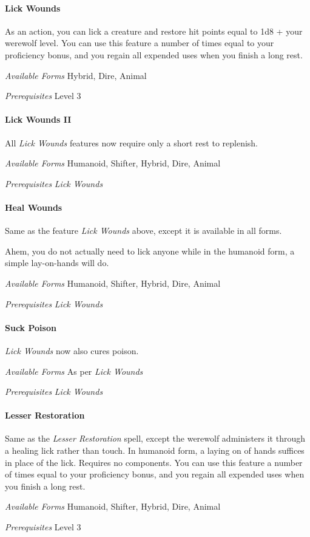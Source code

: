 \documentclass[twocolumn]{dndbook}
\begin{document}
\paragraph*{Lick Wounds}
As an action, you can lick a creature and restore hit points equal to 1d8 + your werewolf level.
You can use this feature a number of times equal to your proficiency bonus, and you regain all expended uses when you finish a long rest.\par
\emph{Available Forms} Hybrid, Dire, Animal\par
\emph{Prerequisites} Level 3\par

\paragraph*{Lick Wounds II}
All \emph{Lick Wounds} features now require only a short rest to replenish.\par
\emph{Available Forms} Humanoid, Shifter, Hybrid, Dire, Animal\par
\emph{Prerequisites} \emph{Lick Wounds}\par

\paragraph*{Heal Wounds}
Same as the feature \emph{Lick Wounds} above, except it is available in all forms.\par
Ahem, you do not actually need to lick anyone while in the humanoid form, a simple lay-on-hands will do.\par
\emph{Available Forms} Humanoid, Shifter, Hybrid, Dire, Animal\par
\emph{Prerequisites} \emph{Lick Wounds}\par

\paragraph*{Suck Poison}
\emph{Lick Wounds} now also cures poison.\par
\emph{Available Forms} As per \emph{Lick Wounds} \par
\emph{Prerequisites} \emph{Lick Wounds}\par

\paragraph*{Lesser Restoration}
Same as the \emph{Lesser Restoration} spell, except the werewolf administers it through a healing lick rather than touch.
In humanoid form, a laying on of hands suffices in place of the lick.
Requires no components.
You can use this feature a number of times equal to your proficiency bonus, and you regain all expended uses when you finish a long rest.\par
\emph{Available Forms} Humanoid, Shifter, Hybrid, Dire, Animal\par
\emph{Prerequisites} Level 3\par
\end{document}

